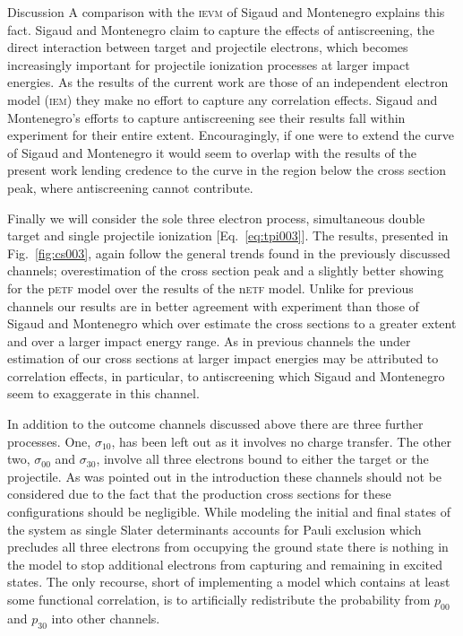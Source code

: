 \documentclass[aps, pra, reprint, groupedaddress, amsfonts, longbibliography,
               amsmath, amssymb, showpacs, nofootinbib]{revtex4-1}
\begin{document}
\begin{section}{Discussion \label{sec:disc}}
   A comparison with the \textsc{ievm} of Sigaud and Montenegro explains this fact. Sigaud and
   Montenegro claim to capture the effects of antiscreening, the direct interaction between target and
   projectile electrons, which becomes increasingly important for projectile ionization processes at
   larger impact energies. As the results of the current work are those of an independent electron model
   (\textsc{iem}) they make no effort to capture any correlation effects. Sigaud and Montenegro's
   efforts to capture antiscreening see their results fall within experiment for their entire extent.
   Encouragingly, if one were to extend the curve of Sigaud and Montenegro it would seem to overlap with
   the results of the present work lending credence to the curve in the region below the cross section
   peak, where antiscreening cannot contribute.

   Finally we will consider the sole three electron process, simultaneous double target and single
   projectile ionization [Eq.~\eqref{eq:tpi003}]. The results, presented in Fig.~\ref{fig:cs003}, again
   follow the general trends found in the previously discussed channels; overestimation of the cross
   section peak and a slightly better showing for the p\textsc{etf} model over the results of the
   n\textsc{etf} model. Unlike for previous channels our results are in better agreement with experiment
   than those of Sigaud and Montenegro which over estimate the cross sections to a greater extent and
   over a larger impact energy range. As in previous channels the under estimation of our cross sections
   at larger impact energies may be attributed to correlation effects, in particular, to antiscreening
   which  Sigaud and Montenegro seem to exaggerate in this channel.

   In addition to the outcome channels discussed above there are three further processes. One,
   $\sigma_{10}$, has been left out as it involves no charge transfer. The other two, $\sigma_{00}$ and
   $\sigma_{30}$, involve all three electrons bound to either the target or the projectile. As was
   pointed out in the introduction these channels should not be considered due to the fact that the
   production cross sections for these configurations should be negligible. While modeling the initial
   and final states of the system as single Slater determinants accounts for Pauli exclusion which
   precludes all three electrons from occupying the ground state there is nothing in the model to stop
   additional electrons from capturing and remaining in excited states. The only recourse, short of
   implementing a model which contains at least some functional correlation, is to artificially
   redistribute the probability from $p_{00}$ and $p_{30}$ into other channels.


\end{section}
\end{document}
